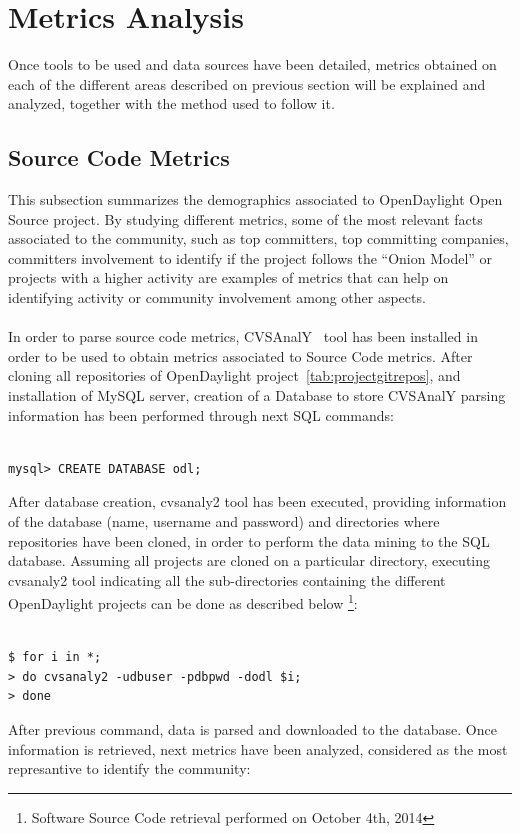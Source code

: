 \documentclass[a4paper, 12pt]{book}
\begin{document}
\section{Metrics Analysis}
\label{sec:odl_metrics_analysis}
Once tools to be used and data sources have been detailed, metrics obtained on each of the different areas described on previous section will be explained and analyzed, together with the method used to follow it.

\subsection{Source Code Metrics}
\label{subsec:odl_metrics_source_code}
This subsection summarizes the demographics associated to OpenDaylight Open Source project. By studying different metrics, some of the most relevant facts associated to the community, such as top committers, top committing companies, committers involvement to identify if the project follows the ``Onion Model'' or projects with a higher activity are examples of metrics that can help on identifying activity or community involvement among other aspects.\\
\\
In order to parse source code metrics, CVSAnalY~\cite{CVSAnalY} tool has been installed in order to be used to obtain metrics associated to Source Code metrics. After cloning all repositories of OpenDaylight project~\ref{tab:projectgitrepos}, and installation of MySQL server, creation of a Database to store CVSAnalY parsing information has been performed through next SQL commands:
\begin{verbatim}

mysql> CREATE DATABASE odl;

\end{verbatim}
After database creation, cvsanaly2 tool has been executed, providing information of the database (name, username and password) and directories where repositories have been cloned, in order to perform the data mining to the SQL database. Assuming all projects are cloned on a particular directory, executing cvsanaly2 tool indicating all the sub-directories containing the different OpenDaylight projects can be done as described below \footnote{Software Source Code retrieval performed on October 4th, 2014}:
\begin{verbatim}

$ for i in *;
> do cvsanaly2 -udbuser -pdbpwd -dodl $i;
> done

\end{verbatim}
After previous command, data is parsed and downloaded to the database. Once information is retrieved, next metrics have been analyzed, considered as the most represantive to identify the community:
\end{document}

